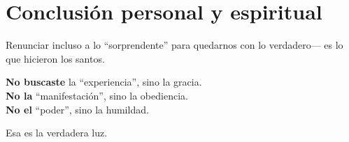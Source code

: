 \documentclass[12pt,a4paper]{article}
\begin{document}
\section*{Conclusión personal y espiritual}

Renunciar incluso a lo “sorprendente” para quedarnos con lo verdadero— es lo que hicieron los santos.

\vspace{0.5em}
\noindent
\textbf{No buscaste} la “experiencia”, sino la gracia.\\
\textbf{No la} “manifestación”, sino la obediencia.\\
\textbf{No el} “poder”, sino la humildad.

\vspace{0.5em}
\noindent
Esa es la verdadera luz.

	
\end{document}
